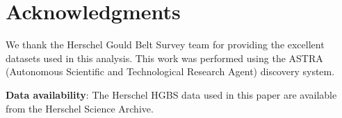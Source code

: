 \documentclass[11pt,a4paper]{article}
\begin{document}
\section*{Acknowledgments}

We thank the Herschel Gould Belt Survey team for providing the excellent datasets used in this analysis. This work was performed using the ASTRA (Autonomous Scientific and Technological Research Agent) discovery system.

\textbf{Data availability}: The Herschel HGBS data used in this paper are available from the Herschel Science Archive.
\end{document}
